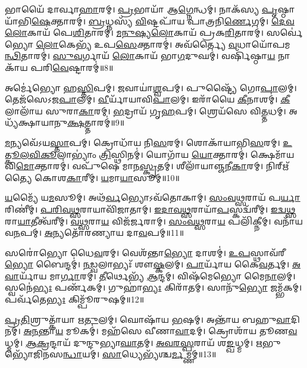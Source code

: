 𑌭𑌾𑌯𑍈᳴ 𑌦𑌾𑌰𑍍𑌵𑌾\-\ul{𑌹𑌾}\-𑌰𑌮𑍍।
\-\ul{𑌪𑍍𑌰}\-𑌭𑌾𑌯𑌾᳴ 𑌆\-\ul{𑌗𑍍𑌨𑍇}\-𑌨𑍍𑌧𑌮𑍍।
𑌨𑌾𑌕᳴𑌸𑍍𑌯 \ul{𑌪𑍃}\-𑌷𑍍𑌠𑌾𑌯𑌾᳴𑌭𑌿\-\-\ul{𑌷𑍇}\-𑌕𑍍𑌤𑌾𑌰𑌮𑍍॑।
\-\ul{𑌬𑍍𑌰}\-𑌧𑍍𑌨𑌸𑍍𑌯᳴ \ul{𑌵𑌿}\-𑌷𑍍𑌟𑌪𑌾᳴𑌯 𑌪𑌾𑌤𑍍𑌰𑌨𑌿\-\ul{𑌰𑍍𑌣𑍇}\-𑌗𑌮𑍍।
\-\ul{𑌦𑍇}\-\-\ul{𑌵}\-\-\ul{𑌲𑍋}\-𑌕𑌾𑌯᳴ 𑌪𑍇\-\ul{𑌶𑌿}\-𑌤𑌾𑌰𑌮𑍍॑।
\-\ul{𑌮}\-\-\ul{𑌨𑍁}\-\-\ul{𑌷𑍍𑌯}\-\-\ul{𑌲𑍋}\-𑌕𑌾𑌯᳴ 𑌪𑍍𑌰𑌕\-\ul{𑌰𑌿}\-𑌤𑌾𑌰𑌮𑍍॑।
𑌸𑌰𑍍𑌵𑍇॑𑌭𑍍𑌯𑍋 \ul{𑌲𑍋}\-𑌕𑍇𑌭𑍍𑌯᳴ 𑌉𑌪\-\ul{𑌸𑍇}\-𑌕𑍍𑌤𑌾𑌰𑌮𑍍॑।
𑌅𑌵᳴𑌰𑍍𑌤𑍍𑌯𑍈 \ul{𑌵}\-𑌧𑌾𑌯𑍋᳴𑌪𑌮\-\ul{𑌨𑍍𑌥𑌿}\-𑌤𑌾𑌰𑌮𑍍॑।
\-\ul{𑌸𑍁}\-\-\ul{𑌵}\-𑌰𑍍𑌗𑌾𑌯᳴ \ul{𑌲𑍋}\-𑌕𑌾𑌯᳴ 𑌭𑌾\-\ul{𑌗}\-𑌦𑍁𑌘𑌮𑍍॑।
𑌵𑌰𑍍\mbox{}𑌷𑌿᳴𑌷𑍍𑌠𑌾\-\ul{𑌯} 𑌨𑌾𑌕𑌾᳴𑌯 𑌪𑌰𑌿\-\ul{𑌵𑍇}\-𑌷𑍍𑌟𑌾𑌰𑌮𑍍॑॥8॥

𑌅𑌰𑍍𑌮𑍇॑𑌭𑍍𑌯𑍋 𑌹\-\ul{𑌸𑍍𑌤𑌿}\-𑌪𑌮𑍍।
\-\ul{𑌜}\-𑌵𑌾𑌯𑌾॑\-\ul{𑌶𑍍𑌵}\-𑌪𑌮𑍍।
𑌪𑍁𑌷𑍍𑌟𑍍𑌯𑍈᳴ 𑌗𑍋\-\ul{𑌪𑌾}\-𑌲𑌮𑍍।
𑌤𑍇𑌜᳴𑌸𑍇\-𑌽𑌜\-\ul{𑌪𑌾}\-𑌲𑌮𑍍।
\-\ul{𑌵𑍀}\-𑌰𑍍𑌯𑌾᳴𑌯𑌾𑌵𑌿\-\ul{𑌪𑌾}\-𑌲𑌮𑍍।
𑌇𑌰𑌾᳴𑌯𑍈 \ul{𑌕𑍀}\-𑌨𑌾𑌶𑌮𑍍॑।
\-\ul{𑌕𑍀}\-𑌲𑌾𑌲𑌾᳴𑌯 𑌸𑍁𑌰𑌾\-\ul{𑌕𑌾}\-𑌰𑌮𑍍।
\-\ul{𑌭}\-𑌦𑍍𑌰𑌾𑌯᳴ 𑌗𑍃\-\ul{𑌹}\-𑌪𑌮𑍍।
𑌶𑍍𑌰𑍇𑌯᳴𑌸𑍇 𑌵𑌿\-\ul{𑌤𑍍𑌤}\-𑌧𑌮𑍍।
𑌅𑌧𑍍𑌯᳴𑌕𑍍𑌷𑌾𑌯𑌾𑌨𑍁\-\ul{𑌕𑍍𑌷}\-𑌤𑍍𑌤𑌾𑌰𑌮𑍍॑॥9॥

\-\ul{𑌮}\-𑌨𑍍𑌯𑌵𑍇᳴\-𑌽𑌯\-\ul{𑌸𑍍𑌤𑌾}\-𑌪𑌮𑍍।
𑌕𑍍𑌰𑍋𑌧𑌾᳴𑌯 𑌨𑌿\-\ul{𑌸}\-𑌰𑌮𑍍।
𑌶𑍋𑌕𑌾᳴𑌯𑌾𑌭𑌿\-\ul{𑌸}\-𑌰𑌮𑍍।
\-\ul{𑌉}\-\-\ul{𑌤𑍍𑌕𑍂}\-\-\ul{𑌲}\-\-\ul{𑌵𑌿}\-\-\ul{𑌕𑍂}\-𑌲𑌾𑌭𑍍𑌯𑌾𑌂॑ \ul{𑌤𑍍𑌰𑌿}\-𑌸𑍍𑌥𑌿𑌨𑌮𑍍॑।
𑌯𑍋𑌗𑌾᳴𑌯 \ul{𑌯𑍋}\-𑌕𑍍𑌤𑌾𑌰𑌮𑍍॑।
𑌕𑍍𑌷𑍇𑌮𑌾᳴𑌯 𑌵𑌿\-\ul{𑌮𑍋}\-𑌕𑍍𑌤𑌾𑌰𑌮𑍍॑।
𑌵𑌪𑍁᳴𑌷𑍇 𑌮𑌾𑌨\-\ul{𑌸𑍍𑌕𑍃}\-𑌤𑌮𑍍।
𑌶𑍀𑌲𑌾᳴𑌯𑌾𑌞𑍍𑌜𑌨𑍀\-\ul{𑌕𑌾}\-𑌰𑌮𑍍।
𑌨𑌿𑌰𑍍\mbox{}𑌋᳴𑌤𑍍𑌯𑍈 𑌕𑍋𑌶\-\ul{𑌕𑌾}\-𑌰𑍀𑌮𑍍।
\-\ul{𑌯}\-𑌮𑌾\-\ul{𑌯𑌾}\-𑌸𑍂𑌮𑍍॥10॥

\-\ul{𑌯}\-𑌮𑍍𑌯𑍈᳴ 𑌯\-\ul{𑌮}\-𑌸𑍂𑌮𑍍।
𑌅𑌥᳴\-\ul{𑌰𑍍𑌵}\-𑌭𑍍𑌯𑍋\-𑌽𑌵᳴𑌤𑍋𑌕𑌾𑌮𑍍।
\-\ul{𑌸𑌂}\-\-\ul{𑌵}\-\-\ul{𑌥𑍍𑌸}\-𑌰𑌾𑌯᳴ 𑌪\-\ul{𑌰𑍍𑌯𑌾}\-𑌰𑌿𑌣𑍀॑𑌮𑍍।
\-\ul{𑌪}\-\-\ul{𑌰𑌿}\-\-\ul{𑌵}\-\-\ul{𑌥𑍍𑌸}\-𑌰𑌾𑌯𑌾\-𑌵𑌿᳴𑌜𑌾𑌤𑌾𑌮𑍍।
\-\ul{𑌇}\-\-\ul{𑌦𑌾}\-\-\ul{𑌵}\-\-\ul{𑌥𑍍𑌸}\-𑌰𑌾𑌯𑌾᳴\-\ul{𑌪}\-\-𑌸𑍍𑌕𑌦𑍍𑌵᳴𑌰𑍀𑌮𑍍।
\-\ul{𑌇}\-\-\ul{𑌦𑍍𑌵}\-\-\ul{𑌥𑍍𑌸}\-𑌰𑌾\-\ul{𑌯𑌾}\-𑌤𑍀𑌤𑍍𑌵᳴𑌰𑍀𑌮𑍍।
\-\ul{𑌵}\-\-\ul{𑌥𑍍𑌸}\-𑌰𑌾\-\ul{𑌯} 𑌵𑌿𑌜᳴𑌰𑍍𑌜𑌰𑌾𑌮𑍍।
\-\ul{𑌸𑌂}\-\-\ul{𑌵}\-\-\ul{𑌥𑍍𑌸}\-𑌰𑌾\-\ul{𑌯} 𑌪𑌲𑌿᳴𑌕𑍍𑌨𑍀𑌮𑍍।
𑌵𑌨𑌾᳴𑌯 𑌵\-\ul{𑌨}\-𑌪𑌮𑍍।
\-\ul{𑌅}\-𑌨𑍍𑌯𑌤𑍋᳴𑌰𑌣𑍍𑌯𑌾𑌯 𑌦𑌾\-\ul{𑌵}\-𑌪𑌮𑍍॥11॥

𑌸𑌰𑍋॑𑌭𑍍𑌯𑍋 𑌧𑍈\-\ul{𑌵}\-𑌰𑌮𑍍।
𑌵𑍇𑌶᳴𑌨𑍍𑌤𑌾\-\ul{𑌭𑍍𑌯𑍋} 𑌦𑌾𑌶𑌮𑍍॑।
\-\ul{𑌉}\-\-\ul{𑌪}\-𑌸𑍍𑌥𑌾𑌵᳴𑌰𑍀\-\ul{𑌭𑍍𑌯𑍋} 𑌬𑍈𑌨𑍍𑌦𑌮𑍍॑।
\-\ul{𑌨}\-\-\ul{𑌡𑍍𑌵}\-𑌲𑌾𑌭𑍍𑌯𑌃᳴ 𑌶𑍗\-\ul{𑌷𑍍𑌕}\-𑌲𑌮𑍍।
\-\ul{𑌪𑌾}\-𑌰𑍍𑌯𑌾᳴𑌯 𑌕𑍈\-\ul{𑌵}\-𑌰𑍍𑌤𑌮𑍍।
\-\ul{𑌅}\-\-\ul{𑌵𑌾}\-𑌰𑍍𑌯𑌾᳴𑌯 𑌮𑌾\-\ul{𑌰𑍍𑌗𑌾}\-𑌰𑌮𑍍।
\-\ul{𑌤𑍀}\-𑌰𑍍𑌥𑍇𑌭𑍍𑌯᳴ \ul{𑌆}\-𑌨𑍍𑌦𑌮𑍍।
𑌵𑌿𑌷᳴𑌮𑍇𑌭𑍍𑌯𑍋 𑌮𑍈\-\ul{𑌨𑌾}\-𑌲𑌮𑍍।
𑌸𑍍𑌵𑌨𑍇॑\-\ul{𑌭𑍍𑌯𑌃} 𑌪𑌰𑍍𑌣᳴𑌕𑌮𑍍।
𑌗𑍁𑌹𑌾॑\-\ul{𑌭𑍍𑌯𑌃} 𑌕𑌿𑌰𑌾᳴𑌤𑌮𑍍।
𑌸𑌾𑌨𑍁᳴\-\ul{𑌭𑍍𑌯𑍋} 𑌜𑌮𑍍𑌭᳴𑌕𑌮𑍍।
𑌪𑌰𑍍𑌵᳴𑌤𑍇\-\ul{𑌭𑍍𑌯𑌃} 𑌕𑌿𑌮𑍍𑌪𑍂᳴𑌰𑍁𑌷𑌮𑍍॥12॥

\-\ul{𑌪𑍍𑌰}\-\-\ul{𑌤𑌿}\-𑌶𑍍𑌰𑍁𑌤𑍍𑌕𑌾᳴𑌯𑌾 𑌋\-\ul{𑌤𑍁}\-𑌲𑌮𑍍।
𑌘𑍋𑌷𑌾᳴𑌯 \ul{𑌭}\-𑌷𑌮𑍍।
𑌅𑌨𑍍𑌤𑌾᳴𑌯 𑌬𑌹𑍁\-\ul{𑌵𑌾}\-𑌦𑌿𑌨𑌮𑍍॑।
\-\ul{𑌅}\-\-\ul{𑌨}\-𑌨𑍍𑌤𑌾\-\ul{𑌯} 𑌮𑍂𑌕𑌮𑍍॑।
𑌮𑌹᳴𑌸𑍇 𑌵𑍀𑌣𑌾\-\ul{𑌵𑌾}\-𑌦𑌮𑍍।
𑌕𑍍𑌰𑍋𑌶𑌾᳴𑌯 𑌤𑍂𑌣\-\ul{𑌵}\-𑌧𑍍𑌮𑌮𑍍।
\-\ul{𑌆}\-\-\ul{𑌕𑍍𑌰}\-𑌨𑍍𑌦𑌾𑌯᳴ 𑌦𑍁𑌨𑍍𑌦𑍁𑌭𑍍𑌯𑌾\-\ul{𑌘𑌾}\-𑌤𑌮𑍍।
\-\ul{𑌅}\-\-\ul{𑌵}\-\-\ul{𑌰}\-\-\ul{𑌸𑍍𑌪}\-𑌰𑌾𑌯᳴ 𑌶\-\ul{𑌙𑍍𑌖}\-𑌧𑍍𑌮𑌮𑍍।
\-\ul{𑌋}\-𑌭𑍁𑌭𑍍𑌯𑍋᳴𑌜𑌿𑌨𑌸\-\ul{𑌨𑍍𑌧𑌾}\-𑌯𑌮𑍍।
\-\ul{𑌸𑌾}\-𑌧𑍍𑌯𑍇𑌭𑍍𑌯᳴𑌶𑍍𑌚\-\ul{𑌰𑍍𑌮}\-𑌮𑍍𑌣𑌮𑍍॥13॥

